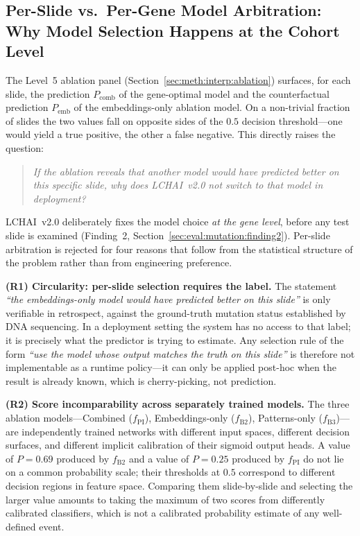 \subsection{Per-Slide vs.\ Per-Gene Model Arbitration: Why Model
Selection Happens at the Cohort Level}
\label{sec:meth:interp:gene_vs_slide_selection}

The Level~5 ablation panel
(Section~\ref{sec:meth:interp:ablation}) surfaces, for each slide,
the prediction $P_{\text{comb}}$ of the gene-optimal model and the
counterfactual prediction $P_{\text{emb}}$ of the embeddings-only
ablation model.
On a non-trivial fraction of slides the two values fall on
opposite sides of the $0.5$ decision threshold---one would yield
a true positive, the other a false negative.
This directly raises the question:

\begin{quote}
    \emph{If the ablation reveals that another model would have
    predicted better on this specific slide, why does LCHAI~v2.0
    not switch to that model in deployment?}
\end{quote}

LCHAI~v2.0 deliberately fixes the model choice \emph{at the gene
level}, before any test slide is examined (Finding~2,
Section~\ref{sec:eval:mutation:finding2}).
Per-slide arbitration is rejected for four reasons that follow
from the statistical structure of the problem rather than from
engineering preference.

\textbf{(R1) Circularity: per-slide selection requires the
label.}
The statement \emph{``the embeddings-only model would have
predicted better on this slide''} is only verifiable in
retrospect, against the ground-truth mutation status established
by DNA sequencing.
In a deployment setting the system has no access to that label;
it is precisely what the predictor is trying to estimate.
Any selection rule of the form \emph{``use the model whose output
matches the truth on this slide''} is therefore not implementable
as a runtime policy---it can only be applied post-hoc when the
result is already known, which is cherry-picking, not prediction.

\textbf{(R2) Score incomparability across separately trained
models.}
The three ablation models---Combined ($f_{\text{PI}}$),
Embeddings-only ($f_{\text{B2}}$), Patterns-only
($f_{\text{B3}}$)---are independently trained networks with
different input spaces, different decision surfaces, and different
implicit calibration of their sigmoid output heads.
A value of $P = 0.69$ produced by $f_{\text{B2}}$ and a value of
$P = 0.25$ produced by $f_{\text{PI}}$ do not lie on a common
probability scale; their thresholds at $0.5$ correspond to
different decision regions in feature space.
Comparing them slide-by-slide and selecting the larger value
amounts to taking the maximum of two scores from differently
calibrated classifiers, which is not a calibrated probability
estimate of any well-defined event.


